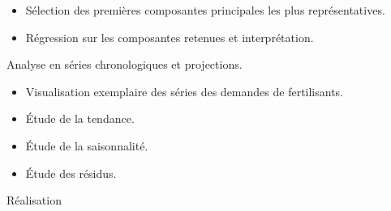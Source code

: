 \begin{description}[align=left]
\begin{itemize}
							\item Sélection des premières composantes principales les plus représentatives.
							\item Régression sur les composantes retenues et interprétation.
						\end{itemize} %
		\item[Lot V :] Analyse en séries chronologiques et projections.
						\begin{itemize}
							\item Visualisation exemplaire des séries des demandes de fertilisants.
							\item Étude de la tendance.
							\item Étude de la saisonnalité.
							\item Étude des résidus.
						\end{itemize}
		\item[Lot VI :] Réalisation
	\end{description}
